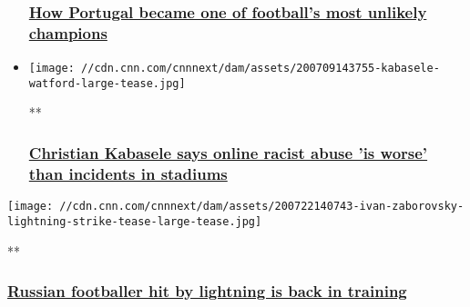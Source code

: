 \begin{itemize}
{  \subsubsection{\texorpdfstring{\href{/videos/sports/2020/07/09/portugal-euro-2016-victory-cedric-soares-jose-fonte-cristiano-ronaldo-football-spt-intl-lon-orig-cmd.cnn}{How
  Portugal became one of football's most unlikely
  champions}}{How Portugal became one of football's most unlikely champions}}\label{how-portugal-became-one-of-footballs-most-unlikely-champions}}
\item
  \href{/videos/sports/2020/07/11/christian-kabasele-spt-intl.cnn}{}

  \texttt{[image: //cdn.cnn.com/cnnnext/dam/assets/200709143755-kabasele-watford-large-tease.jpg]}

  **

  \hypertarget{christian-kabasele-says-online-racist-abuse-is-worse-than-incidents-in-stadiums}{%
  \subsubsection{\texorpdfstring{\href{/videos/sports/2020/07/11/christian-kabasele-spt-intl.cnn}{Christian
  Kabasele says online racist abuse 'is worse' than incidents in
  stadiums}}{Christian Kabasele says online racist abuse 'is worse' than incidents in stadiums}}\label{christian-kabasele-says-online-racist-abuse-is-worse-than-incidents-in-stadiums}}
\end{itemize}

\href{/videos/sports/2020/07/22/ivan-zaborovsky-lightning-strike-recovery-znamya-truda-russia-football-spt-intl-lon-orig.cnn}{}

\texttt{[image: //cdn.cnn.com/cnnnext/dam/assets/200722140743-ivan-zaborovsky-lightning-strike-tease-large-tease.jpg]}

**

\hypertarget{russian-footballer-hit-by-lightning-is-back-in-training}{%
\subsubsection{\texorpdfstring{\href{/videos/sports/2020/07/22/ivan-zaborovsky-lightning-strike-recovery-znamya-truda-russia-football-spt-intl-lon-orig.cnn}{Russian
footballer hit by lightning is back in
training}}{Russian footballer hit by lightning is back in training}}\label{russian-footballer-hit-by-lightning-is-back-in-training}}

\href{/videos/sports/2020/06/26/liverpool-back-to-the-future-1990-2020-premier-league-title-football-spt-intl-lon-orig.cnn}{}

